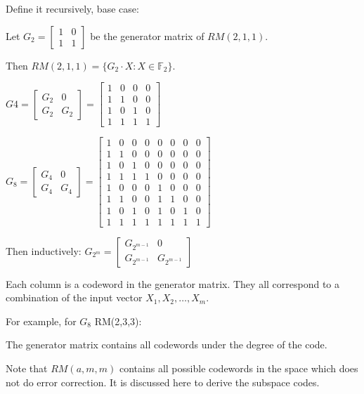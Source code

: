 \documentclass[letterpaper,12pt]{article}
\begin{document}
Define it recursively, base case:

Let $G_2=\begin{bmatrix}
    1 & 0 \\
    1 & 1 
\end{bmatrix}$ be the generator matrix of $RM(2,1,1)$. 

Then $RM(2,1,1)=\{G_2\cdot X: X\in \mathbb{F}_2\}$.

$G4 = \begin{bmatrix}
    G_2 & 0 \\
    G_2 & G_2
\end{bmatrix} = \begin{bmatrix}
    1 & 0 & 0 & 0 \\
    1 & 1 & 0 & 0 \\
    1 & 0 & 1 & 0 \\
    1 & 1 & 1 & 1
\end{bmatrix} $

$G_8 = \begin{bmatrix}
    G_4 & 0 \\
    G_4 & G_4
\end{bmatrix} = \begin{bmatrix} 
    1 & 0 & 0 & 0 & 0 & 0 & 0 & 0 \\
    1 & 1 & 0 & 0 & 0 & 0 & 0 & 0 \\
    1 & 0 & 1 & 0 & 0 & 0 & 0 & 0 \\
    1 & 1 & 1 & 1 & 0 & 0 & 0 & 0 \\
    1 & 0 & 0 & 0 & 1 & 0 & 0 & 0 \\
    1 & 1 & 0 & 0 & 1 & 1 & 0 & 0 \\
    1 & 0 & 1 & 0 & 1 & 0 & 1 & 0 \\
    1 & 1 & 1 & 1 & 1 & 1 & 1 & 1
\end{bmatrix}$

Then inductively: $G_{2^m} = \begin{bmatrix}
    G_{2^{m-1}} & 0 \\
    G_{2^{m-1}} & G_{2^{m-1}}
\end{bmatrix}$

Each column is a codeword in the generator matrix. They all correspond to a combination of the input vector $X_1, X_2, \ldots, X_m$. 

For example, for $G_8$ RM(2,3,3): 

The generator matrix contains all codewords under the degree of the code. 

Note that $RM(a,m,m)$ contains all possible codewords in the space which does not do error correction. It is discussed here to derive the subspace codes. 
\end{document}
